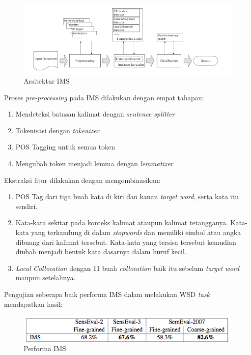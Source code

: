 \begin{figure}
	\centering
	\includegraphics[width=1\linewidth]{adit_pics/Arsitektur-IMS}
	\caption{Arsitektur IMS}
	\label{fig:Arsitektur-IMS}
\end{figure}

Proses \textit{pre-processing} pada IMS dilakukan dengan empat tahapan:
\begin{enumerate}
	\item Mendeteksi batasan kalimat dengan \textit{sentence splitter}
	\item Tokenisasi dengan \textit{tokenizer}
	\item POS Tagging untuk semua token
	\item Mengubah token menjadi lemma dengan \textit{lemmatizer}
\end{enumerate}

Ekstraksi fitur dilakukan dengan mengombinasikan:

\begin{enumerate}
	\item POS Tag dari tiga buah kata di kiri dan kanan \textit{target word}, serta kata itu sendiri. 
	\item Kata-kata sekitar pada konteks kalimat ataupun kalimat tetangganya. Kata-kata yang terkandung di dalam \textit{stopwords} dan memiliki simbol atau angka dibuang dari kalimat tersebut. Kata-kata yang tersisa tersebut kemudian diubah menjadi bentuk kata dasarnya dalam huruf kecil.
	\item \textit{Local Collocation} dengan 11 buah \textit{collocation} baik itu sebelum \textit{target word} maupun setelahnya. 
\end{enumerate}

Pengujian seberapa baik performa IMS dalam melakukan  WSD \textit{task} mendapatkan hasil:

\begin{figure}
	\centering
	\includegraphics[width=1\linewidth]{adit_pics/Performa-IMS}
	\caption{Performa IMS \citep{zhong2010makes}}
	\label{fig:Performa-IMS}
\end{figure}

